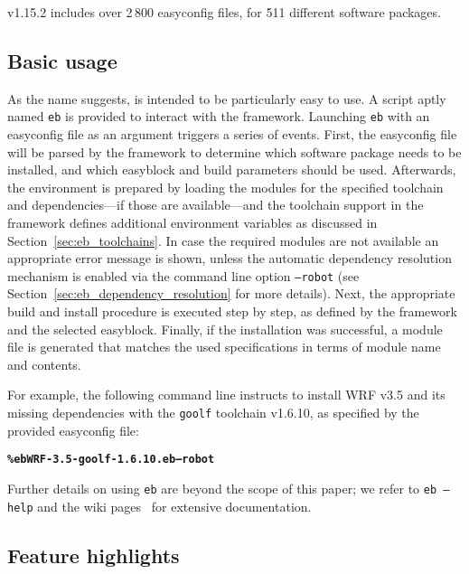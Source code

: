 \easybuild{} v1.15.2 includes over 2\,800 easyconfig files, for
511 different software packages. 

\subsection{Basic usage}
\label{sec:eb_basic_usage}

As the name suggests, \easybuild{} is intended to be particularly easy to use. A script aptly named
\texttt{\small eb} is provided to interact with the \easybuild{} framework.
Launching \texttt{\small eb} with an easyconfig file as an argument triggers a
series of events. First, the easyconfig file will be parsed by the \easybuild{}
framework to determine which software package needs to be installed, and which
easyblock and build parameters should be used. Afterwards, the environment is
prepared by loading the modules for the specified toolchain and dependencies---if
those are available---and the toolchain support in the framework defines additional
environment variables as discussed in Section~\ref{sec:eb_toolchains}. In case the
required modules are not available an appropriate error message is shown, unless
the automatic dependency resolution mechanism is enabled via the command line option
\texttt{\small --robot} (see Section~\ref{sec:eb_dependency_resolution} for more
details). Next,
the appropriate build and install procedure is executed step by step, as defined by
the framework and the selected easyblock. Finally, if the installation was successful, a module file is generated that
matches the used specifications in terms of module name and contents.

For example, the following command line instructs \easybuild{} to install WRF v3.5
and its missing dependencies with the \texttt{\small goolf} toolchain v1.6.10, as
specified by the provided easyconfig file:

{\small
\begin{alltt}
    \textbf{\% eb WRF-3.5-goolf-1.6.10.eb --robot}
\end{alltt}
}
\noindent
Further details on using \texttt{\small eb} are beyond the scope of this paper; we
refer to \texttt{\small eb --help} and the \easybuild{} wiki pages~\cite{ebwiki} for
extensive documentation.

\subsection{Feature highlights}
\label{sec:eb_features}


